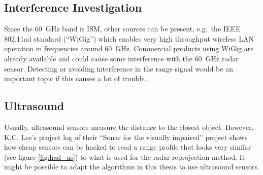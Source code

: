 \subsection{Interference Investigation}\label{interference-investigation}

Since the \SI{60}{GHz} band is ISM, other sources can be present, e.g.~the
IEEE 802.11ad standard \cite{IEEE2014} (``WiGig'') which enables very
high throughput wireless LAN operation in frequencies around \SI{60}{GHz}.
Commercial products using WiGig are already available and could cause
some interference with the \SI{60}{GHz} radar sensor. Detecting or avoiding
interference in the range signal would be an important topic if this
causes a lot of trouble.

\subsection{Ultrasound}\label{ultrasound}

Usually, ultrasound sensors measure the distance to the closest object.
However, K.C. Lee's project log of their ``Sonar for the visually
impaired'' project \cite{Lee2015} shows how cheap sensors can be hacked
to read a range profile that looks very similar (see figure \cref{fig:had_us}) to
what is used for the radar reprojection method. It might be possible to
adapt the algorithms in this thesis to use ultrasound sensors.

